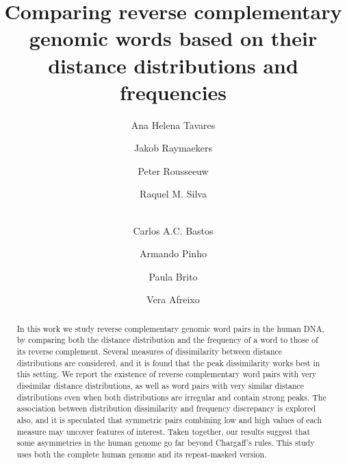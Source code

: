 \documentclass[review,12pt]{elsarticle}
\begin{document}
\begin{frontmatter}

\title{Comparing reverse complementary genomic words
 based on their distance distributions and frequencies\\ \vspace{1cm}}


\author{Ana Helena Tavares}
\author{Jakob Raymaekers}
\author{Peter Rousseeuw}
\author{Raquel M. Silva}
\author{\\Carlos A.C. Bastos}
\author{Armando Pinho}
\author{Paula Brito}
\author{Vera Afreixo}









\begin{abstract}
In this work we study reverse complementary genomic word pairs in the human DNA, by
comparing both the distance distribution and the frequency of a word to those of its
reverse complement. Several measures of dissimilarity between distance distributions
are considered, and it is found that the peak dissimilarity works best in this setting.
We report the existence of reverse complementary
word pairs with very dissimilar distance
distributions, as well as word pairs with very similar distance distributions even
when both distributions are irregular and contain strong peaks. The association
between distribution dissimilarity and frequency discrepancy is explored also, and it is
speculated that symmetric pairs combining low and high values of each measure may
uncover features of interest. Taken together, our results suggest that some
asymmetries in the human genome go far beyond Chargaff's rules. This study uses both
the complete human genome and its repeat-masked version.
\end{abstract}



\end{frontmatter}
\end{document}
